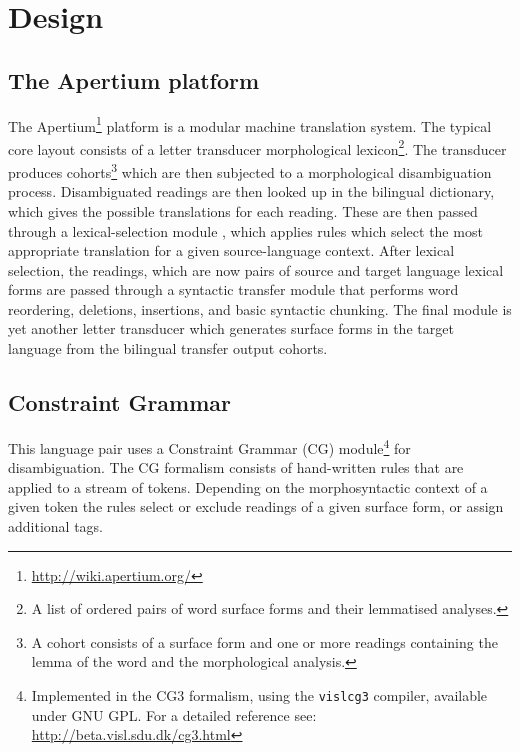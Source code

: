 \section{Design}
\subsection{The Apertium platform}
\nocite{forcada2011apertium}
The Apertium\footnote{\url{http://wiki.apertium.org/}} platform is a
modular machine translation system. The typical core layout consists
of a letter transducer morphological lexicon\footnote{A list of
ordered pairs of word surface forms and their lemmatised
analyses.}. The transducer produces cohorts\footnote{A cohort 
consists of a surface form and one or more readings containing the lemma of the 
word and the morphological analysis.} which are then subjected to a
morphological disambiguation process.
%
Disambiguated readings are then looked up in the bilingual dictionary,
which gives the possible translations for each reading. These
are then passed through a lexical-selection module \citep{tyers12a}, 
which applies rules which select the most appropriate translation
for a given source-language context.
After lexical selection, the readings, which are now pairs of source
and target language lexical forms are passed through a 
syntactic transfer module that performs word reordering, deletions,
insertions, and basic syntactic chunking.
%
The final module is yet another letter transducer which generates
surface forms in the target language from the bilingual transfer
output cohorts.

\subsection{Constraint Grammar}
This language pair uses a Constraint Grammar (CG)
module\footnote{Implemented in the CG3 formalism, using the
  \texttt{vislcg3} compiler, available under GNU GPL. For a detailed
  reference see: \url{http://beta.visl.sdu.dk/cg3.html}} for
disambiguation. The CG formalism consists of hand-written rules that
are applied to a stream of tokens. Depending on the morphosyntactic
context of a given token the rules select or exclude readings of a
given surface form, or assign additional tags.
